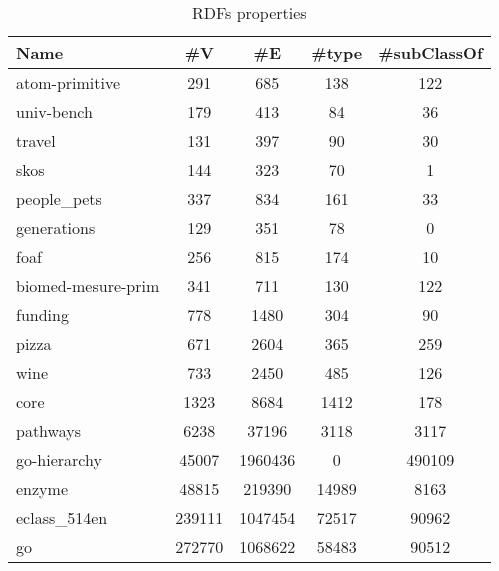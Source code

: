 {\setlength{\tabcolsep}{0.4em}
	\begin{table}[h]
		\caption{RDFs properties}
		\label{tbl:propRDF}
		\begin{tabular}{| l | c | c | c | c |}
			\hline
			Name                  & \#V    & \#E     & \#type &\#subClassOf \\
			\hline
			\hline
			atom-primitive				& 291		& 685		& 138	& 122	\\
			univ-bench					& 179		& 413		& 84		& 36		\\
			travel						& 131		& 397		& 90		& 30		\\
			skos							& 144		& 323		& 70		& 1		\\
			people\_pets					& 337		& 834		& 161	& 33		\\
			generations					& 129		& 351		& 78		& 0		\\
			foaf							& 256		& 815		& 174	& 10		\\
			biomed-mesure-prim   	    & 341		& 711		& 130	& 122	\\
			funding						& 778		& 1480		& 304	& 90               \\
			pizza						& 671		& 2604		& 365	& 259              \\
			wine							& 733		& 2450		& 485	& 126              \\
			core							& 1323		& 8684		& 1412	& 178              \\
			pathways						& 6238		& 37196		& 3118 	& 3117             \\
			go-hierarchy					& 45007		& 1960436	& 0		& 490109           \\
			enzyme						& 48815		& 219390		& 14989	& 8163             \\
			eclass\_514en				& 239111		& 1047454	& 72517	& 90962            \\
			go							& 272770		& 1068622	& 58483	& 90512            \\
			\hline
		\end{tabular}
	\end{table}
}


